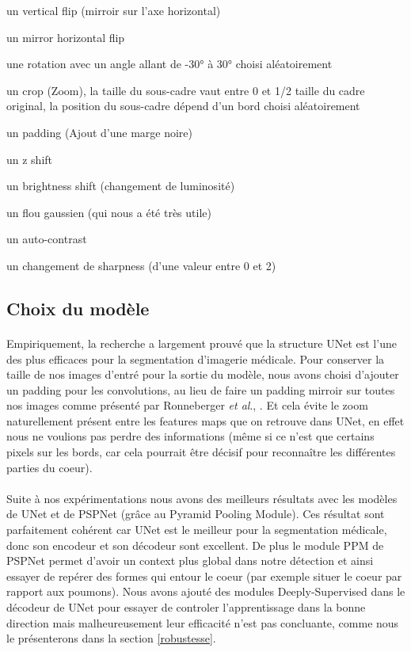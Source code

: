 \documentclass[french, english]{article}
\newcommand{\etal}{\textit{et al}., }
\begin{document}
\begin{list}{\textbullet}{}
 \item un vertical flip (mirroir sur l'axe horizontal)
 \item un mirror horizontal flip
 \item une rotation avec un angle allant de -30° à 30° choisi aléatoirement
 \item un crop (Zoom), la taille du sous-cadre vaut entre 0 et 1/2 taille du cadre original, la position du sous-cadre dépend d'un bord choisi aléatoirement
 \item un padding (Ajout d'une marge noire)
 \item un z shift
 \item un brightness shift (changement de luminosité)
 \item un flou gaussien (qui nous a été très utile)
 \item un auto-contrast
 \item un changement de sharpness (d'une valeur entre 0 et 2)
\end{list}


\subsection{Choix du modèle}
\paragraph{}Empiriquement, la recherche a largement prouvé que la structure UNet est l'une des plus efficaces pour la segmentation d'imagerie médicale.
Pour conserver la taille de nos images d'entré pour la sortie du modèle, nous avons choisi d'ajouter un padding pour les convolutions, au lieu de faire un padding mirroir sur toutes nos images comme présenté par Ronneberger \etal\cite{UNet}. 
Et cela évite le zoom naturellement présent entre les features maps que on retrouve dans UNet, en effet nous ne voulions pas perdre des informations (même si ce n'est que certains pixels sur les bords, car cela pourrait être décisif pour reconnaître les différentes parties du coeur).\\

\paragraph{}Suite à nos expérimentations nous avons des meilleurs résultats avec les modèles de UNet et de PSPNet (grâce au Pyramid Pooling Module). Ces résultat sont parfaitement cohérent car UNet est le meilleur pour la segmentation médicale, donc son encodeur et son décodeur sont excellent. 
De plus le module PPM de PSPNet permet d'avoir un context plus global dans notre détection et ainsi essayer de repérer des formes qui entour le coeur (par exemple situer le coeur par rapport aux poumons).
Nous avons ajouté des modules Deeply-Supervised dans le décodeur de UNet pour essayer de controler l'apprentissage dans la bonne direction mais malheureusement leur efficacité n'est pas concluante, comme nous le présenterons dans la section \ref{robustesse}.
\end{document}
